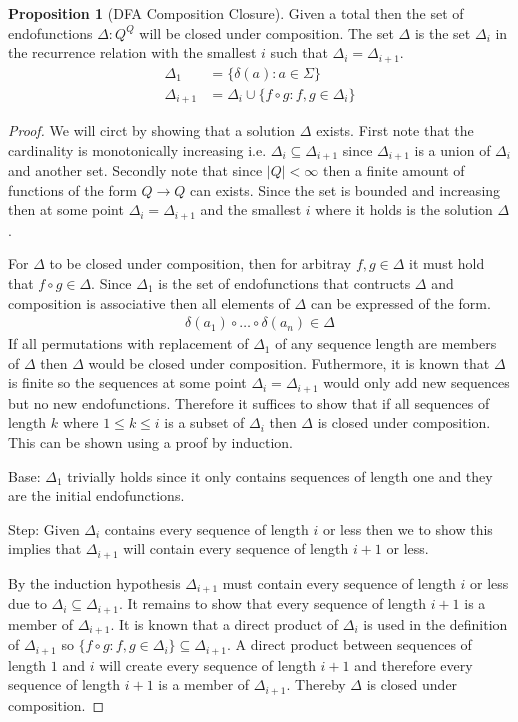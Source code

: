 \documentclass[a4paper,12pt]{article}
\theoremstyle{definition}
\newtheorem{proposition}{Proposition}[section]
\begin{document}
\begin{proposition}[DFA Composition Closure]
  Given a total then the set of endofunctions $\Delta: Q^Q$ will be closed under composition. The set $\Delta$ is the set $\Delta_i$ in the recurrence relation with the smallest $i$ such that $\Delta_i = \Delta_{i + 1}$.
  \begin{align*}
    \Delta_1 &= \{\delta(a) : a \in \Sigma \} \\
    \Delta_{i + 1} &= \Delta_i \cup \{f \circ g : f, g \in \Delta_i\}
  \end{align*}
\end{proposition}
\begin{proof}
  We will circt by showing that a solution $\Delta$ exists. First note that the cardinality is monotonically increasing i.e. $\Delta_i \subseteq \Delta_{i + 1}$ since $\Delta_{i + 1}$ is a union of $\Delta_i$ and another set. Secondly note that since $|Q| < \infty$ then a finite amount of functions of the form $Q \to Q$ can exists. Since the set is bounded and increasing then at some point $\Delta_i = \Delta_{i + 1}$ and the smallest $i$ where it holds is the solution $\Delta$.

  For $\Delta$ to be closed under composition, then for arbitray $f, g \in \Delta$ it must hold that $f \circ g \in \Delta$. Since $\Delta_1$ is the set of endofunctions that contructs $\Delta$ and composition is associative then all elements of $\Delta$ can be expressed of the form.
  \begin{align*}
    \delta(a_1) \circ \dots \circ \delta(a_n) \in \Delta
  \end{align*}
  If all permutations with replacement of $\Delta_1$ of any sequence length are members of $\Delta$ then $\Delta$ would be closed under composition. Futhermore, it is known that $\Delta$ is finite so the sequences at some point $\Delta_i = \Delta_{i + 1}$ would only add new sequences but no new endofunctions. Therefore it suffices to show that if all sequences of length $k$ where $1 \leq k \leq i$ is a subset of $\Delta_i$ then $\Delta$ is closed under composition. This can be shown using a proof by induction.

  Base: $\Delta_1$ trivially holds since it only contains sequences of length one and they are the initial endofunctions.

  Step: Given $\Delta_i$ contains every sequence of length $i$ or less then we to show this implies that $\Delta_{i + 1}$ will contain every sequence of length $i + 1$ or less.

  By the induction hypothesis $\Delta_{i + 1}$ must contain every sequence of length $i$ or less due to $\Delta_i \subseteq \Delta_{i + 1}$. It remains to show that every sequence of length $i + 1$ is a member of $\Delta_{i + 1}$. It is known that a direct product of $\Delta_i$ is used in the definition of $\Delta_{i + 1}$ so $\{f \circ g : f, g \in \Delta_i\} \subseteq \Delta_{i + 1}$. A direct product between sequences of length $1$ and $i$ will create every sequence of length $i + 1$ and therefore every sequence of length $i + 1$ is a member of $\Delta_{i + 1}$. Thereby $\Delta$ is closed under composition.
\end{proof}
\end{document}
